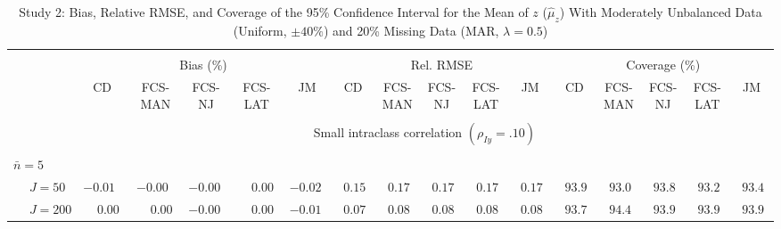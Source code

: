 \begin{sidewaystable}
\begin{threeparttable}
\setlength{\tabcolsep}{1.0pt}
\renewcommand{\arraystretch}{0.95}
\footnotesize
\caption{\small Study 2: Bias, Relative RMSE, and Coverage of the 95\% Confidence Interval for the Mean of $z$ ($\hat\mu_z$) With Moderately Unbalanced Data (Uniform, $\pm 40\%$) and 20\% Missing Data (MAR, $\lambda=0.5$)}
\begin{tabular}{llccccccccccccccc}
\hline\\[-1.8ex]
& & \multicolumn{5}{c}{Bias (\%)} & \multicolumn{5}{c}{Rel. RMSE} & \multicolumn{5}{c}{Coverage (\%)} \\ \cmidrule(r){3-7}\cmidrule(r){8-12}\cmidrule(r){13-17}
 &  & CD & \makecell{FCS-\\MAN} & \makecell{FCS-\\NJ} & \makecell{FCS-\\LAT} & JM & CD & \makecell{FCS-\\MAN} & \makecell{FCS-\\NJ} & \makecell{FCS-\\LAT} & JM & CD & \makecell{FCS-\\MAN} & \makecell{FCS-\\NJ} & \makecell{FCS-\\LAT} & \multicolumn{1}{c}{JM} \\ 
[0.4ex]\hline\\[-1.8ex]
& & \multicolumn{15}{c}{Small intraclass correlation $(\rho_{Iy}=.10)$} \\[0.6ex]\hline\\[-1.8ex]
\multicolumn{4}{l}{$\bar{n}=5$} \\  & \nopagebreak $\;J=50$  & ${-}0.01\phantom{0}$ & ${-}0.00\phantom{0}$ & ${-}0.00\phantom{0}$ & $\phantom{-}0.00\phantom{0}$ & ${-}0.02\phantom{0}$ & $\phantom{0}0.15\phantom{0}$ & $\phantom{0}0.17\phantom{0}$ & $\phantom{0}0.17\phantom{0}$ & $\phantom{0}0.17\phantom{0}$ & $\phantom{0}0.17\phantom{0}$ & $\phantom{0}93.9\phantom{0}$ & $\phantom{0}93.0\phantom{0}$ & $\phantom{0}93.8\phantom{0}$ & $\phantom{0}93.2\phantom{0}$ & $\phantom{0}93.4\phantom{0}$ \\
 & \nopagebreak $\;J=200$  & $\phantom{-}0.00\phantom{0}$ & $\phantom{-}0.00\phantom{0}$ & ${-}0.00\phantom{0}$ & $\phantom{-}0.00\phantom{0}$ & ${-}0.01\phantom{0}$ & $\phantom{0}0.07\phantom{0}$ & $\phantom{0}0.08\phantom{0}$ & $\phantom{0}0.08\phantom{0}$ & $\phantom{0}0.08\phantom{0}$ & $\phantom{0}0.08\phantom{0}$ & $\phantom{0}93.7\phantom{0}$ & $\phantom{0}94.4\phantom{0}$ & $\phantom{0}93.9\phantom{0}$ & $\phantom{0}93.9\phantom{0}$ & $\phantom{0}93.9\phantom{0}$ \\

\end{tabular}
\end{threeparttable}
\end{sidewaystable}
